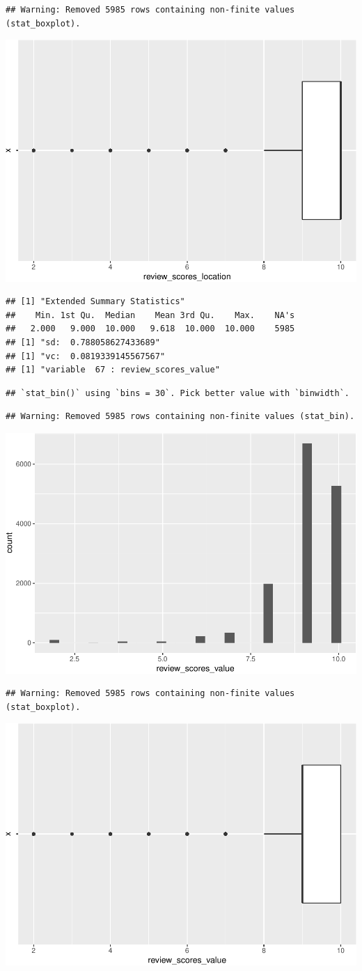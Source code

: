 \begin{verbatim}
## Warning: Removed 5985 rows containing non-finite values (stat_boxplot).
\end{verbatim}

\includegraphics[width=0.5\linewidth]{anal_files/figure-latex/figures-side-49}

\begin{verbatim}
## [1] "Extended Summary Statistics"
##    Min. 1st Qu.  Median    Mean 3rd Qu.    Max.    NA's 
##   2.000   9.000  10.000   9.618  10.000  10.000    5985 
## [1] "sd:  0.788058627433689"
## [1] "vc:  0.0819339145567567"
## [1] "variable  67 : review_scores_value"
\end{verbatim}

\begin{verbatim}
## `stat_bin()` using `bins = 30`. Pick better value with `binwidth`.
\end{verbatim}

\begin{verbatim}
## Warning: Removed 5985 rows containing non-finite values (stat_bin).
\end{verbatim}

\includegraphics[width=0.5\linewidth]{anal_files/figure-latex/figures-side-50}

\begin{verbatim}
## Warning: Removed 5985 rows containing non-finite values (stat_boxplot).
\end{verbatim}

\includegraphics[width=0.5\linewidth]{anal_files/figure-latex/figures-side-51}

